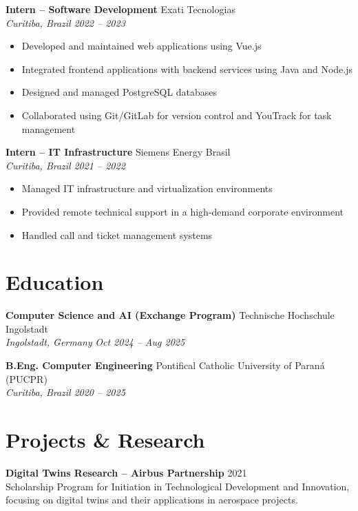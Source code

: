 \documentclass[11pt,a4paper]{article}
\newcommand{\entry}[4]{
    \textbf{#1} \hfill #2 \\
    \textit{#3} \hfill \textit{#4}
}
\begin{document}
\vspace{3pt}

\entry{Intern -- Software Development}{Exati Tecnologias}{Curitiba, Brazil}{2022 -- 2023}
\begin{itemize}[nosep, leftmargin=*]
    \item Developed and maintained web applications using Vue.js
    \item Integrated frontend applications with backend services using Java and Node.js
    \item Designed and managed PostgreSQL databases
    \item Collaborated using Git/GitLab for version control and YouTrack for task management
\end{itemize}

\vspace{3pt}

\entry{Intern -- IT Infrastructure}{Siemens Energy Brasil}{Curitiba, Brazil}{2021 -- 2022}
\begin{itemize}[nosep, leftmargin=*]
    \item Managed IT infrastructure and virtualization environments
    \item Provided remote technical support in a high-demand corporate environment
    \item Handled call and ticket management systems
\end{itemize}

\section{Education}

\entry{Computer Science and AI (Exchange Program)}{Technische Hochschule Ingolstadt}{Ingolstadt, Germany}{Oct 2024 -- Aug 2025}

\vspace{3pt}

\entry{B.Eng. Computer Engineering}{Pontifical Catholic University of Paraná (PUCPR)}{Curitiba, Brazil}{2020 -- 2025}

\section{Projects \& Research}

\textbf{Digital Twins Research -- Airbus Partnership} \hfill 2021 \\
Scholarship Program for Initiation in Technological Development and Innovation, focusing on digital twins and their applications in aerospace projects.
\end{document}
